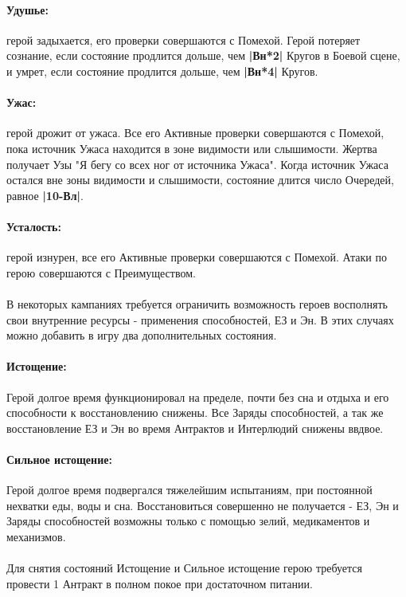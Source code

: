 \paragraph{Удушье:} герой задыхается, его проверки совершаются с Помехой. Герой потеряет сознание, если состояние продлится дольше, чем \textbf{|Вн*2|} Кругов в Боевой сцене, и умрет, если состояние продлится дольше, чем \textbf{|Вн*4|} Кругов.  
\paragraph{Ужас:} герой дрожит от ужаса. Все его Активные проверки совершаются с Помехой, пока источник Ужаса находится в зоне видимости или слышимости. Жертва получает Узы "Я бегу со всех ног от источника Ужаса".
\newline Когда источник Ужаса остался вне зоны видимости и слышимости, состояние длится число Очередей, равное \textbf{|10-Вл|}.
\paragraph{Усталость:} герой изнурен, все его Активные проверки совершаются с Помехой. Атаки по герою совершаются с Преимуществом.
\begin{tcolorbox}
\paragraph{} В некоторых кампаниях требуется ограничить возможность героев восполнять свои внутренние ресурсы - применения способностей, ЕЗ и Эн. В этих случаях можно добавить в игру два дополнительных состояния.
\paragraph{Истощение:} Герой долгое время функционировал на пределе, почти без сна и отдыха и его способности к восстановлению снижены. Все Заряды способностей, а так же восстановление ЕЗ и Эн во время Антрактов и Интерлюдий снижены ввдвое.
\paragraph{Сильное истощение:} Герой долгое время подвергался тяжелейшим испытаниям, при постоянной нехватки еды, воды и сна. Восстановиться совершенно не получается - ЕЗ, Эн и Заряды способностей возможны только с помощью зелий, медикаментов и механизмов.
\paragraph{} Для снятия состояний Истощение и Сильное истощение герою требуется провести 1 Антракт в полном покое при достаточном питании.
\end{tcolorbox}
